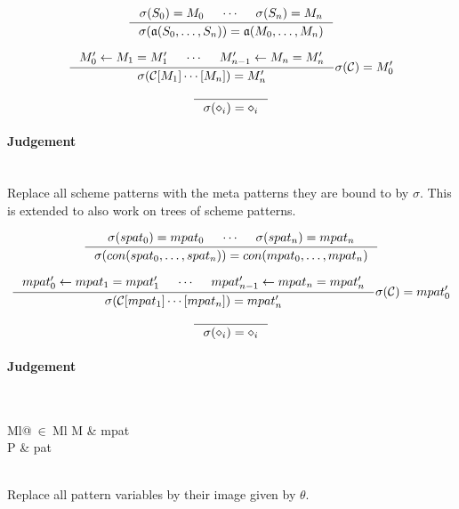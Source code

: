 \[
\inference
{
  \sigma(S_0) = M_0 &
  \cdots &
  \sigma(S_n) = M_n
}
{
  \sigma (\mathfrak{a} (S_0, \ldots, S_n)) =
  \mathfrak{a} (M_0, \ldots, M_n)
}
\]

\[
\inference
{
  M'_0 <- M_1 = M'_1 &
  \cdots &
  M'_{n-1} <- M_n = M'_n
}
{
  \sigma (\mathcal{C}[M_1]\cdots[M_n]) = M'_n
}
{
  \sigma(\mathcal{C}) = M'_0
}
\]

\[
\inference
{
}
{
  \sigma(\diamond_i) = \diamond_i
}
\]


\paragraph{Judgement} \\

Replace all scheme patterns with the meta patterns they are bound to by
$\sigma$. This is extended to also work on trees of scheme patterns.

\[
\inference
{
  \sigma(spat_0) = mpat_0 &
  \cdots &
  \sigma(spat_n) = mpat_n
}
{
  \sigma (con (spat_0, \ldots, spat_n)) =
  con (mpat_0, \ldots, mpat_n)
}
\]

\[
\inference
{
  mpat'_0 <- mpat_1 = mpat'_1 &
  \cdots &
  mpat'_{n-1} <- mpat_n = mpat'_n
}
{
  \sigma (\mathcal{C}[mpat_1]\cdots[mpat_n]) = mpat'_n
}
{
  \sigma(\mathcal{C}) = mpat'_0
}
\]

\[
\inference
{
}
{
  \sigma(\diamond_i) = \diamond_i
}
\]

\clearpage

\paragraph{Judgement} \\
\indent\begin{tabular}{Ml@{$\ \in\ $}Ml}
  M & mpat\\
  P & pat
\end{tabular}\\

Replace all pattern variables by their image given by $\theta$.


